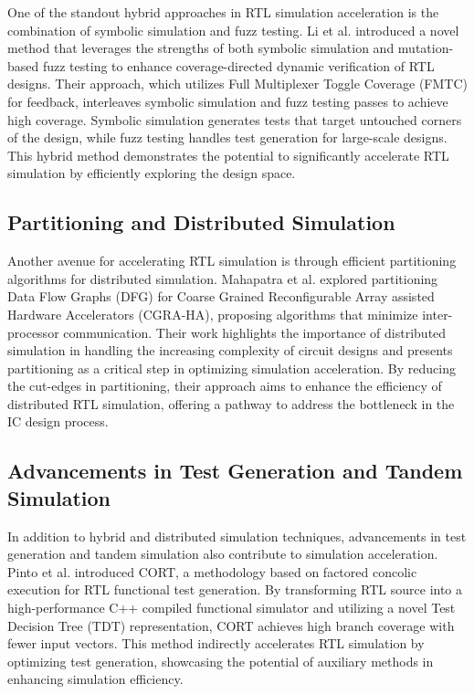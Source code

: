\documentclass[conference]{IEEEtran}
\begin{document}
One of the standout hybrid approaches in RTL simulation acceleration is the combination of symbolic simulation and fuzz testing. Li et al. \cite{liSymbolicSimulationEnhanced2021} introduced a novel method that leverages the strengths of both symbolic simulation and mutation-based fuzz testing to enhance coverage-directed dynamic verification of RTL designs. Their approach, which utilizes Full Multiplexer Toggle Coverage (FMTC) for feedback, interleaves symbolic simulation and fuzz testing passes to achieve high coverage. Symbolic simulation generates tests that target untouched corners of the design, while fuzz testing handles test generation for large-scale designs. This hybrid method demonstrates the potential to significantly accelerate RTL simulation by efficiently exploring the design space.

\subsection{Partitioning and Distributed Simulation}

Another avenue for accelerating RTL simulation is through efficient partitioning algorithms for distributed simulation. Mahapatra et al. \cite{mahapatraDFGPartitioningAlgorithms2018} explored partitioning Data Flow Graphs (DFG) for Coarse Grained Reconfigurable Array assisted Hardware Accelerators (CGRA-HA), proposing algorithms that minimize inter-processor communication. Their work highlights the importance of distributed simulation in handling the increasing complexity of circuit designs and presents partitioning as a critical step in optimizing simulation acceleration. By reducing the cut-edges in partitioning, their approach aims to enhance the efficiency of distributed RTL simulation, offering a pathway to address the bottleneck in the IC design process.

\subsection{Advancements in Test Generation and Tandem Simulation}

In addition to hybrid and distributed simulation techniques, advancements in test generation and tandem simulation also contribute to simulation acceleration. Pinto et al. \cite{pintoRTLFunctionalTest2017} introduced CORT, a methodology based on factored concolic execution for RTL functional test generation. By transforming RTL source into a high-performance C++ compiled functional simulator and utilizing a novel Test Decision Tree (TDT) representation, CORT achieves high branch coverage with fewer input vectors. This method indirectly accelerates RTL simulation by optimizing test generation, showcasing the potential of auxiliary methods in enhancing simulation efficiency.
\end{document}
